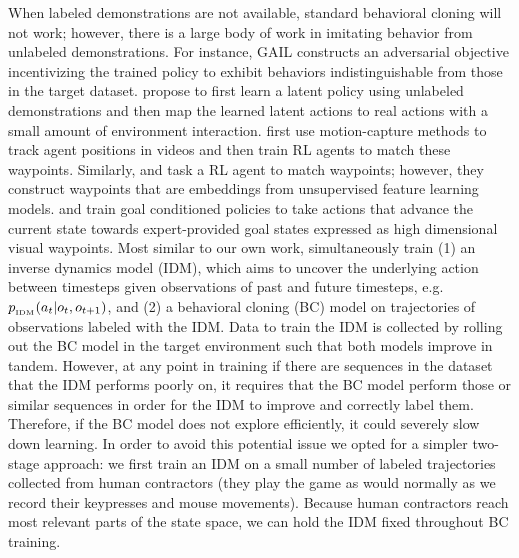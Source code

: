 When labeled demonstrations are not available, standard behavioral cloning will not work; however, there is a large body of work in imitating behavior from unlabeled demonstrations. \cite{torabi2019recent} For instance, GAIL \cite{ho2016generative} constructs an adversarial objective incentivizing the trained policy to exhibit behaviors indistinguishable from those in the target dataset.
\citet{edwards2019imitating} propose to first learn a latent policy using unlabeled demonstrations and then map the learned latent actions to real actions with a small amount of environment interaction.
\citet{peng2018sfv} first use motion-capture methods to track agent positions in videos and then train RL agents to match these waypoints.
Similarly, \citet{behbahani2019learning} and \citet{aytar2018playing} task a RL agent to match waypoints; however, they construct waypoints that are embeddings from unsupervised feature learning models. 
\citet{pathakICLR18zeroshot} and \citet{nairICRA2017combine} train goal conditioned policies to take actions that advance the current state towards expert-provided goal states expressed as high dimensional visual waypoints.
Most similar to our own work, \citet{torabi2018behavioral} simultaneously train (1) an inverse dynamics model (IDM),\cite{nguyen2008learning} which aims to uncover the underlying action between timesteps given observations of past and future timesteps, e.g.\ $p_{\textrm{\textsubscript{IDM}}}(a_t | o_t, o_{t+1})$, and (2) a behavioral cloning (BC) model on trajectories of observations labeled with the IDM.
Data to train the IDM is collected by rolling out the BC model in the target environment such that both models improve in tandem.
However, at any point in training if there are sequences in the dataset that the IDM performs poorly on, it requires that the BC model perform those or similar sequences in order for the IDM to improve and correctly label them.
Therefore, if the BC model does not explore efficiently, it could severely slow down learning.
In order to avoid this potential issue we opted for a simpler two-stage approach: we first train an IDM on a small number of labeled trajectories collected from human contractors (they play the game as would normally as we record their keypresses and mouse movements). Because human contractors reach most relevant parts of the state space, we can hold the IDM fixed throughout BC training.

